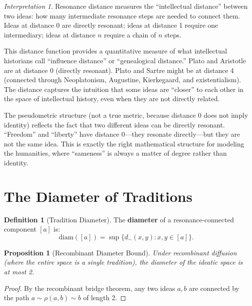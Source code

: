 \documentclass[11pt,openany]{book}
\theoremstyle{definition}
\newtheorem{definition}[axiom]{Definition}
\theoremstyle{plain}
\newtheorem{proposition}[axiom]{Proposition}
\theoremstyle{remark}
\newtheorem{interpretation}[axiom]{Interpretation}
\newcommand{\res}{\sim}                      %
\begin{document}
\begin{interpretation}
Resonance distance measures the ``intellectual distance'' between two ideas: how many intermediate resonance steps are needed to connect them. Ideas at distance 0 are directly resonant; ideas at distance 1 require one intermediary; ideas at distance $n$ require a chain of $n$ steps.

This distance function provides a quantitative measure of what intellectual historians call ``influence distance'' or ``genealogical distance.'' Plato and Aristotle are at distance 0 (directly resonant). Plato and Sartre might be at distance 4 (connected through Neoplatonism, Augustine, Kierkegaard, and existentialism). The distance captures the intuition that some ideas are ``closer'' to each other in the space of intellectual history, even when they are not directly related.

The pseudometric structure (not a true metric, because distance 0 does not imply identity) reflects the fact that two different ideas can be directly resonant. ``Freedom'' and ``liberty'' have distance 0---they resonate directly---but they are not the same idea. This is exactly the right mathematical structure for modeling the humanities, where ``sameness'' is always a matter of degree rather than identity.
\end{interpretation}

\section{The Diameter of Traditions}

\begin{definition}[Tradition Diameter]
The \textbf{diameter} of a resonance-connected component $[a]$ is:
\[
\mathrm{diam}([a]) = \sup\{d_{\res}(x, y) : x, y \in [a]\}.
\]
\end{definition}

\begin{proposition}[Recombinant Diameter Bound]
Under recombinant diffusion (where the entire space is a single tradition), the diameter of the ideatic space is at most 2.
\end{proposition}

\begin{proof}
By the recombinant bridge theorem, any two ideas $a, b$ are connected by the path $a \res \rho(a,b) \res b$ of length 2.
\end{proof}
\end{document}
